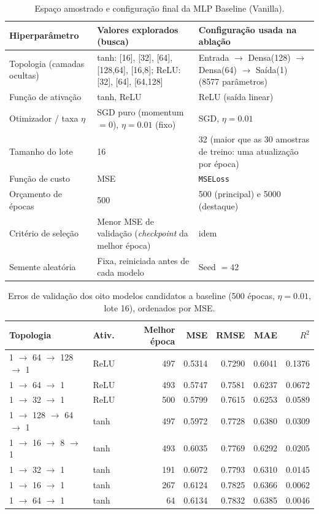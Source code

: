 \documentclass[11pt,a4paper]{article}
\begin{document}
\begin{table}[H]
\centering\small
\caption{Espaço amostrado e configuração final da MLP Baseline (Vanilla).}
\label{tab:config}
\begin{tabular}{p{3.0cm}p{6.7cm}p{5.2cm}}
\toprule
Hiperparâmetro & Valores explorados (busca) & Configuração usada na ablação \\
\midrule
Topologia (camadas ocultas) & tanh: [16], [32], [64], [128,64], [16,8]; ReLU: [32], [64], [64,128] & Entrada $\to$ Densa(128) $\to$ Densa(64) $\to$ Saída(1) (8577 parâmetros) \\
Função de ativação & tanh, ReLU & ReLU (saída linear) \\
Otimizador / taxa $\eta$ & SGD puro (momentum $=0$), $\eta=0.01$ (fixo) & SGD, $\eta=0.01$ \\
Tamanho do lote & 16 & 32 (maior que as 30 amostras de treino: uma atualização por época) \\
Função de custo & MSE & \texttt{MSELoss} \\
Orçamento de épocas & 500 & 500 (principal) e 5000 (destaque) \\
Critério de seleção & Menor MSE de validação (\textit{checkpoint} da melhor época) & idem \\
Semente aleatória & Fixa, reiniciada antes de cada modelo & Seed $=42$ \\
\bottomrule
\end{tabular}
\end{table}

\begin{table}[H]
\centering\small
\caption{Erros de validação dos oito modelos candidatos a baseline (500 épocas, $\eta=0.01$, lote 16), ordenados por MSE.}
\label{tab:cand}
\begin{tabular}{llrrrrr}
\toprule
Topologia & Ativ. & Melhor época & MSE & RMSE & MAE & $R^2$ \\
\midrule
1 $\to$ 64 $\to$ 128 $\to$ 1 & ReLU & 497 & 0.5314 & 0.7290 & 0.6041 & 0.1376 \\
1 $\to$ 64 $\to$ 1 & ReLU & 493 & 0.5747 & 0.7581 & 0.6237 & 0.0672 \\
1 $\to$ 32 $\to$ 1 & ReLU & 500 & 0.5799 & 0.7615 & 0.6253 & 0.0589 \\
1 $\to$ 128 $\to$ 64 $\to$ 1 & tanh & 497 & 0.5972 & 0.7728 & 0.6380 & 0.0309 \\
1 $\to$ 16 $\to$ 8 $\to$ 1 & tanh & 493 & 0.6035 & 0.7769 & 0.6292 & 0.0205 \\
1 $\to$ 32 $\to$ 1 & tanh & 191 & 0.6072 & 0.7793 & 0.6310 & 0.0145 \\
1 $\to$ 16 $\to$ 1 & tanh & 267 & 0.6124 & 0.7825 & 0.6366 & 0.0062 \\
1 $\to$ 64 $\to$ 1 & tanh & 64 & 0.6134 & 0.7832 & 0.6385 & 0.0046 \\
\bottomrule
\end{tabular}
\end{table}
\end{document}

